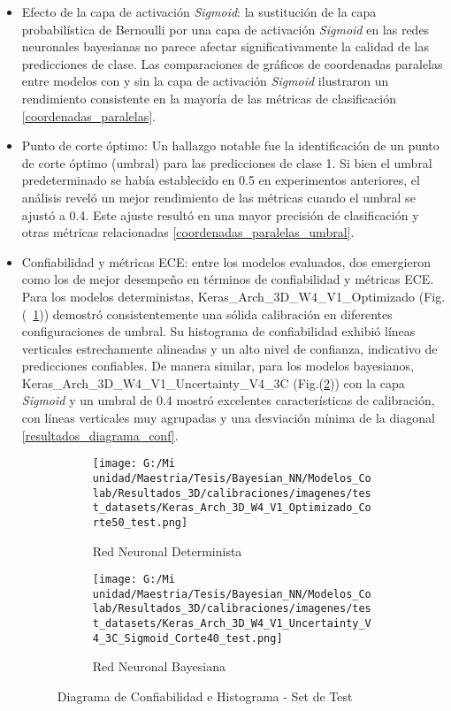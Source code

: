 \documentclass[10pt, oneside, a4paper]{article}
\begin{document}
	\begin{itemize}
		\item Efecto de la capa de activación \textsl{Sigmoid}: la sustitución de la capa probabilística de Bernoulli por una capa de activación \textsl{Sigmoid} en las redes neuronales bayesianas no parece afectar significativamente la calidad de las predicciones de clase. Las comparaciones de gráficos de coordenadas paralelas entre modelos con y sin la capa de activación \textsl{Sigmoid} ilustraron un rendimiento consistente en la mayoría de las métricas de clasificación \ref{coordenadas_paralelas}.
		
		\item Punto de corte óptimo: Un hallazgo notable fue la identificación de un punto de corte óptimo (umbral) para las predicciones de clase 1. Si bien el umbral predeterminado se había establecido en 0.5 en experimentos anteriores, el análisis reveló un mejor rendimiento de las métricas cuando el umbral se ajustó a 0.4. Este ajuste resultó en una mayor precisión de clasificación y otras métricas relacionadas \ref{coordenadas_paralelas_umbral}.
		
		\item Confiabilidad y métricas ECE: entre los modelos evaluados, dos emergieron como los de mejor desempeño en términos de confiabilidad y métricas ECE. Para los modelos deterministas, Keras\_Arch\_3D\_W4\_V1\_Optimizado (Fig.(~\ref{fig:conf_determinsita})) demostró consistentemente una sólida calibración en diferentes configuraciones de umbral. Su histograma de confiabilidad exhibió líneas verticales estrechamente alineadas y un alto nivel de confianza, indicativo de predicciones confiables. De manera similar, para los modelos bayesianos, Keras\_Arch\_3D\_W4\_V1\_Uncertainty\_V4\_3C (Fig.(\ref{fig:conf_bayesiana})) con la capa \textsl{Sigmoid} y un umbral de 0.4 mostró excelentes características de calibración, con líneas verticales muy agrupadas y una desviación mínima de la diagonal \ref{resultados_diagrama_conf}.
		
	\begin{figure}[H]
	\centering
	\begin{subfigure}[H]{0.45\textwidth} %
		\centering
		\texttt{[image: G:/Mi unidad/Maestria/Tesis/Bayesian\_NN/Modelos\_Colab/Resultados\_3D/calibraciones/imagenes/test\_datasets/Keras\_Arch\_3D\_W4\_V1\_Optimizado\_Corte50\_test.png]}
		\caption{Red Neuronal Determinista}
		\label{fig:conf_determinsita}
	\end{subfigure}
	\hfill
	\begin{subfigure}[H]{0.45\textwidth} %
		\centering
		\texttt{[image: G:/Mi unidad/Maestria/Tesis/Bayesian\_NN/Modelos\_Colab/Resultados\_3D/calibraciones/imagenes/test\_datasets/Keras\_Arch\_3D\_W4\_V1\_Uncertainty\_V4\_3C\_Sigmoid\_Corte40\_test.png]}
		\caption{Red Neuronal Bayesiana}
		\label{fig:conf_bayesiana}
	\end{subfigure}
	\caption{Diagrama de Confiabilidad e Histograma - Set de Test}
	\label{fig:conf_mejores}
	\end{figure}
		
	\end{itemize}		
	
\end{document}
